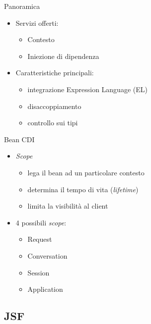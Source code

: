 \begin{frame}{Panoramica}

\begin{itemize}
\item Servizi offerti:
	\begin{itemize}
	\item Contesto
	\item Iniezione di dipendenza
	\end{itemize}

\item Caratteristiche principali:
	\begin{itemize}
	\item integrazione Expression Language (EL)
	\item disaccoppiamento
	\item controllo sui tipi
	\end{itemize}
\end{itemize}

\end{frame}

\begin{frame}{Bean CDI}

\begin{itemize}
\item \textsl{Scope}
	\begin{itemize}
	\item lega il bean ad un particolare contesto
	\item determina il tempo di vita (\textsl{lifetime})
	\item limita la visibilità al client
	\end{itemize}
	
\item 4 possibili \textsl{scope}:
	\begin{itemize}
	\item Request
	\item Conversation
	\item Session
	\item Application
	\end{itemize}

\end{itemize}

\end{frame}



\subsection{JSF}

